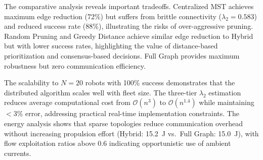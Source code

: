 \documentclass[conference]{IEEEconf}
\theoremstyle{plain}
\begin{document}
The comparative analysis reveals important tradeoffs. Centralized MST achieves maximum edge reduction (72\%) but suffers from brittle connectivity ($\lambda_2 = 0.583$) and reduced success rate (88\%), illustrating the risks of over-aggressive pruning. Random Pruning and Greedy Distance achieve similar edge reduction to Hybrid but with lower success rates, highlighting the value of distance-based prioritization and consensus-based decisions. Full Graph provides maximum robustness but zero communication efficiency.

The scalability to $N=20$ robots with 100\% success demonstrates that the distributed algorithm scales well with fleet size. The three-tier $\lambda_2$ estimation reduces average computational cost from $\mathcal{O}(n^3)$ to $\mathcal{O}(n^{1.4})$ while maintaining $<3\%$ error, addressing practical real-time implementation constraints. The energy analysis shows that sparse topologies reduce communication overhead without increasing propulsion effort (Hybrid: 15.2~J vs.\ Full Graph: 15.0~J), with flow exploitation ratios above 0.6 indicating opportunistic use of ambient currents.





\end{document}
